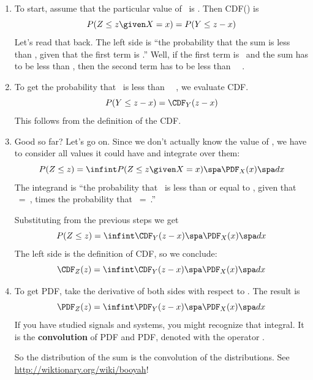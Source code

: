 \documentclass[12pt]{book}
\begin{document}
\begin{enumerate}

\item To start, assume that the particular value
of \X~is \x.  Then CDF(\z) is 
%
\[ P(Z \le z \given X = x)  =  P(Y \le z-x) \]
%
Let's read that back.  
The left side is ``the probability that the sum is less than
\z, given that the first term is \x.''  Well, if
the first term is \x~and the sum has to be less than \z, then the
second term has to be less than \z~\minus~\x.

\item To get the probability that \Y~is less than \z~\minus~\x, we
evaluate CDF.
%
\[ P(Y \le z-x) = \CDF_Y(z-x) \]
%
This follows from the definition of the CDF.

\item Good so far?  Let's go on.  Since we don't actually know
the value of \x, we have to consider all values it could have and
integrate over them:
%
\[ P(Z \le z) = \infint P(Z \le z \given X = x) \spa \PDF_X(x) \spa dx \]
%
The integrand is ``the probability that \Z~is less than or equal
to \z, given that \X~=~\x, times the probability that \X~=~\x.''

Substituting from the previous steps we get
%
\[ P(Z \le z) = \infint \CDF_Y(z-x) \spa \PDF_X(x) \spa dx \]
%
The left side is the definition of CDF, so we conclude:
%
\[ \CDF_Z(z) = \infint \CDF_Y(z-x) \spa \PDF_X(x) \spa dx \]
%

\item To get PDF, take the derivative of
both sides with respect to \z.  The result is
%
\[ \PDF_Z(z) = \infint \PDF_Y(z-x) \spa \PDF_X(x) \spa dx  \]
%
If you have studied signals and systems, you might recognize that
integral.  It is the {\bf convolution} of PDF and PDF, 
denoted with the operator \mystar.


So the distribution of the sum is the convolution of the distributions.
See \url{http://wiktionary.org/wiki/booyah}!

\end{enumerate}
\end{document}
